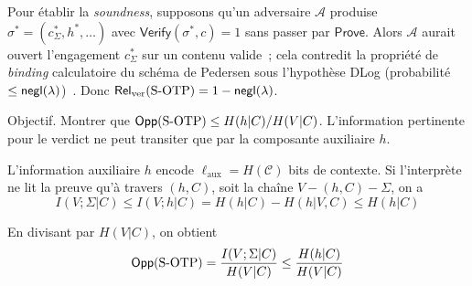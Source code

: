 \begin{sloppypar}
\begin{Preuve}
Pour \'etablir la \emph{soundness}, supposons qu'un adversaire $\mathcal{A}$ produise
$\sigma^* = (c_\Sigma^*, h^*, \ldots)$ avec $\mathsf{Verify}(\sigma^*, c) = 1$
sans passer par $\mathsf{Prove}$. Alors $\mathcal{A}$ aurait ouvert
l'engagement $c_\Sigma^*$ sur un contenu valide~; cela contredit la
propri\'et\'e de \emph{binding} calculatoire du sch\'ema de Pedersen sous
l'hypoth\`ese DLog (probabilit\'e $\leq \mathsf{negl}(\lambda)$)~\cite{Pedersen91}. Donc
$\mathsf{Rel}_{\mathrm{ver}}(\text{S-OTP}) = 1 - \mathsf{negl}(\lambda)$.
\end{Preuve}

\begin{Preuve}\label{prv:sotp_opp}

\begin{cmtEtape}{Objectif.}
Montrer que $\mathsf{Opp}(\text{S-OTP}) \leq H(h|C)/H(V|C)$.
L'information pertinente pour le verdict ne peut transiter que par la
composante auxiliaire $h$.
\end{cmtEtape}

L'information auxiliaire $h$ encode $\ell_{\text{aux}} = H(\mathcal{C})$
bits de contexte. Si l'interpr\`ete ne lit la preuve qu'\`a travers $(h, C)$, soit la cha\^ine
$V - (h, C) - \Sigma$, on a
\begin{equation}
I(V;\Sigma|C) \leq I(V;h|C) = H(h|C) - H(h|V,C) \leq H(h|C)
\end{equation}

En divisant par $H(V|C)$, on obtient
\begin{equation}
\mathsf{Opp}(\text{S-OTP}) = \frac{I(V;\Sigma|C)}{H(V|C)}
\leq \frac{H(h|C)}{H(V|C)}
\end{equation}
\end{Preuve}


\end{sloppypar}
